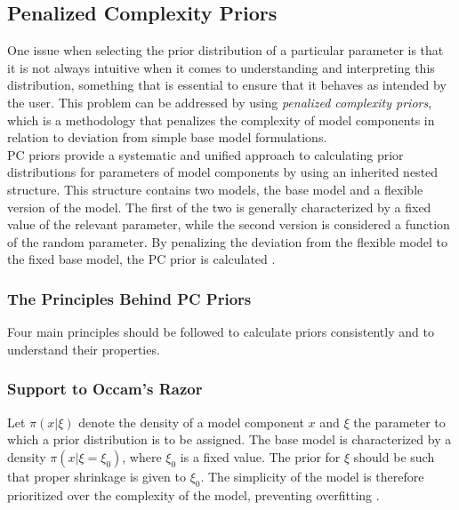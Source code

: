 \subsection{Penalized Complexity Priors}\label{sec:pc_prior}
One issue when selecting the prior distribution of a particular parameter is that it is not always intuitive when it comes to understanding and interpreting this distribution, something that is essential to ensure that it behaves as intended by the user. This problem can be addressed by using \textit{penalized complexity priors}, which is a methodology that penalizes the complexity of model components in relation to deviation from simple base model formulations.\\
PC priors provide a systematic and unified approach to calculating prior distributions for parameters of model components by using an inherited nested structure. This structure contains two models, the base model and a flexible version of the model. The first of the two is generally characterized by a fixed value of the relevant parameter, while the second version is considered a function of the random parameter. By penalizing the deviation from the flexible model to the fixed base model, the PC prior is calculated \autocite[][]{sorbye2017penalised}.
\subsubsection{The Principles Behind PC Priors}
Four main principles should be followed to calculate priors consistently and to understand their properties.
\subsubsection*{Support to Occam's Razor} 
Let $\pi\left(x|\xi\right)$ denote the density of a model component $x$ and $\xi$ the parameter to which a prior distribution is to be assigned. The base model is characterized by a density $\pi\left(x|\xi=\xi_0\right)$, where $\xi_0$ is a fixed value. The prior for $\xi$ should be such that proper shrinkage is given to $\xi_0$. The simplicity of the model is therefore prioritized over the complexity of the model, preventing overfitting \autocite[][]{sorbye2017penalised}. \clearpage
